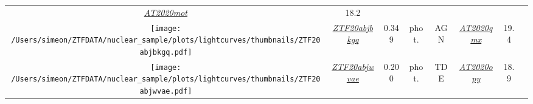 \begin{table*}
{\begin{tabular}{c c  c  c  c   c  c  c}
      \textit{\href{https://www.wis-tns.org/object/2020mot}{AT2020mot}}                                                                           & 18.2                                                                                              &                                                                                                            \\
      \parbox[c]{12em}{\texttt{[image: /Users/simeon/ZTFDATA/nuclear\_sample/plots/lightcurves/thumbnails/ZTF20abjbkgq.pdf]}} & \textit{\href{https://ztfnuclear.simeonreusch.com/transient/ZTF20abjbkgq}{ZTF20abjbkgq}}          & 0.349          & phot.                   & AGN               &
      \textit{\href{https://www.wis-tns.org/object/2020qmx}{AT2020qmx}}                                                                           & 19.4                                                                                              &                                                                                                            \\
      \parbox[c]{12em}{\texttt{[image: /Users/simeon/ZTFDATA/nuclear\_sample/plots/lightcurves/thumbnails/ZTF20abjwvae.pdf]}} & \textit{\href{https://ztfnuclear.simeonreusch.com/transient/ZTF20abjwvae}{ZTF20abjwvae}}          & 0.200          & phot.                   & TDE               &
      \textit{\href{https://www.wis-tns.org/object/2020opy}{AT2020opy}}                                                                           & 18.9                                                                                              &                                                                                                            \\
    \end{tabular}}
\end{table*}



